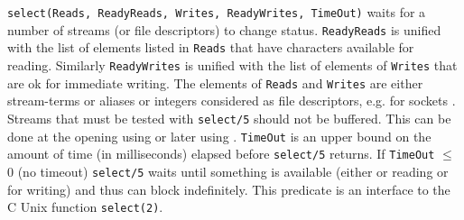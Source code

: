 \texttt{select(Reads, ReadyReads, Writes, ReadyWrites, TimeOut)} waits for a
number of streams (or file descriptors) to change status.
\texttt{ReadyReads} is unified with the list of elements listed in
\texttt{Reads} that have characters available for reading. Similarly
\texttt{ReadyWrites} is unified with the list of elements of \texttt{Writes}
that are ok for immediate writing. The elements of \texttt{Reads} and
\texttt{Writes} are either stream-terms or aliases or integers considered as
file descriptors, e.g. for sockets . Streams
that must be tested with \texttt{select/5} should not be buffered. This can
be done at the opening using   or later using
 .
\texttt{TimeOut} is an upper bound on the amount of time (in milliseconds)
elapsed before \texttt{select/5} returns. If \texttt{TimeOut} $\leq$ 0 (no
timeout) \texttt{select/5} waits until something is available (either or
reading or for writing) and thus can block indefinitely. This predicate is
an interface to the C Unix function \texttt{select(2)}.

